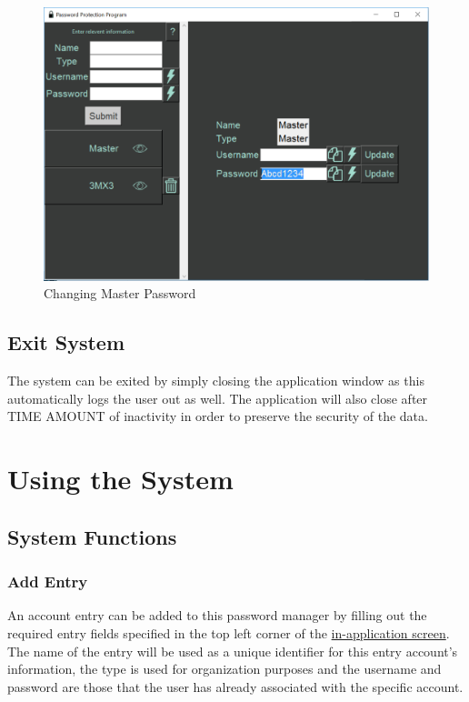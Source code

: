 \documentclass[12pt, titlepage]{article}
\begin{document}
\begin{figure}[h]
	\centering
	\includegraphics[scale=0.7]{images/ChangeMasPass.PNG}
	\caption{Changing Master Password}
	\label{fig:chMasPass}
\end{figure}


\subsection{Exit System} \label{SysExit}

The system can be exited by simply closing the application window as this automatically logs the user out as well. The application will also close after TIME AMOUNT of inactivity in order to preserve the security of the data.


\newpage
\section{Using the System} \label{SysUse}


\subsection{System Functions} \label{SysFunc}

\subsubsection{Add Entry} \label{AddEnt}

An account entry can be added to this password manager by filling out the required entry fields specified in the top left corner of the \hyperref[fig:InApp]{in-application screen}. The name of the entry will be used as a unique identifier for this entry account's information, the type is used for organization purposes and the username and password are those that the user has already associated with the specific account.
\end{document}
